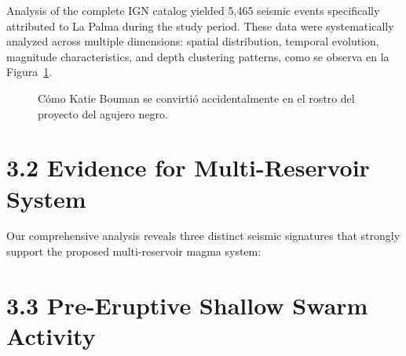 \documentclass[
  spanish,
  letterpaper,
]{book}
\begin{document}
Analysis of the complete IGN catalog yielded 5,465 seismic events
specifically attributed to La Palma during the study period. These data
were systematically analyzed across multiple dimensions: spatial
distribution, temporal evolution, magnitude characteristics, and depth
clustering patterns, como se observa en la
Figura~\ref{fig-result-dataset}.

\begin{figure}


\caption{\label{fig-result-dataset}Cómo Katie Bouman se convirtió
accidentalmente en el rostro del proyecto del agujero negro.}

\end{figure}%

\section{3.2 Evidence for Multi-Reservoir
System}\label{evidence-for-multi-reservoir-system}

Our comprehensive analysis reveals three distinct seismic signatures
that strongly support the proposed multi-reservoir magma system:

\section{3.3 Pre-Eruptive Shallow Swarm
Activity}\label{pre-eruptive-shallow-swarm-activity}
\end{document}
